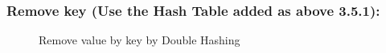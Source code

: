 \subsubsection{Remove key (Use the Hash Table added as above 3.5.1):}
\begin{figure}[H]
	\centering
	\qquad
	\caption{Remove value by key by Double Hashing}%
\end{figure}

